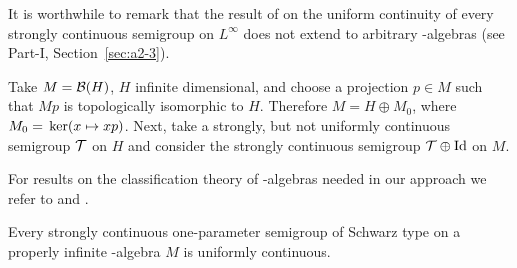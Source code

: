 It is worthwhile to remark that the result of  \textcite{lotz:1985} on the uniform continuity of every strongly continuous semigroup on $L^{\infty}$  does not extend to arbitrary \WA-algebras (see Part-I, Section~\ref{sec:a2-3}).
\begin{example}\label{ex:d2-1.1}
Take $M = \mathcal{B}(H)$, $H$ infinite dimensional, and choose a projection $p \in M$ such that $Mp$ is topologically isomorphic to $H$.
Therefore $M = H \oplus M_{0}$, where $M_{0} = \mathop{}\mathrm{ker}(x \mapsto xp)$.
Next, take a strongly, but not uniformly continuous semigroup $\mathcal{T}$ on $H$ and consider the strongly continuous semigroup $\mathcal{T} \oplus \operatorname{Id}$ on $M$.
\end{example}
For results on the classification theory of \WA-algebras needed in our approach we refer to \textcite[2.2]{sakai:1971} and \textcite[V.1]{takesaki:1979}.
\begin{theorem}\label{thm:schwarz_uniform}
Every strongly continuous one-parameter semigroup of Schwarz type on a properly infinite \WA-algebra $M$ is uniformly continuous.
\end{theorem}
